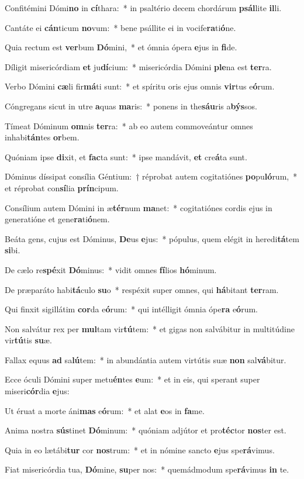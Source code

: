 \item Confitémini Dómi\textbf{no} in \textbf{cí}thara:~* in psaltério decem chordárum \textbf{psál}lite \textbf{il}li.
\item Cantáte ei \textbf{cán}ticum \textbf{no}vum:~* bene psállite ei in vocife\textbf{ra}ti\textbf{ó}ne.
\item Quia rectum est \textbf{ver}bum \textbf{Dó}mini,~* et ómnia ópera \textbf{e}jus in \textbf{fi}de.
\item Díligit misericórdiam \textbf{et} ju\textbf{dí}cium:~* misericórdia Dómini \textbf{ple}na est \textbf{ter}ra.
\item Verbo Dómini \textbf{cæ}li fir\textbf{má}ti sunt:~* et spíritu oris ejus omnis \textbf{vir}tus e\textbf{ó}rum.
\item Cóngregans sicut in utre \textbf{a}quas \textbf{ma}ris:~* ponens in the\textbf{sáu}ris a\textbf{býs}sos.
\item Tímeat Dóminum \textbf{om}nis \textbf{ter}ra:~* ab eo autem commoveántur omnes inhabi\textbf{tán}tes \textbf{or}bem.
\item Quóniam ipse \textbf{di}xit, et \textbf{fac}ta sunt:~* ipse mandávit, \textbf{et} cre\textbf{á}ta sunt.
\item Dóminus díssipat consília Géntium:~† réprobat autem cogitatiónes \textbf{po}pu\textbf{ló}rum,~* et réprobat con\textbf{sí}lia \textbf{prín}cipum.
\item Consílium autem Dómini in æ\textbf{tér}num \textbf{ma}net:~* cogitatiónes cordis ejus in generatióne et gene\textbf{ra}ti\textbf{ó}nem.
\item Beáta gens, cujus est Dóminus, \textbf{De}us \textbf{e}jus:~* pópulus, quem elégit in heredi\textbf{tá}tem \textbf{si}bi.
\item De cælo re\textbf{spé}xit \textbf{Dó}minus:~* vidit omnes \textbf{fí}lios \textbf{hó}minum.
\item De præparáto habi\textbf{tá}culo \textbf{su}o~* respéxit super omnes, qui \textbf{há}bitant \textbf{ter}ram.
\item Qui finxit sigillátim \textbf{cor}da e\textbf{ó}rum:~* qui intélligit ómnia ópe\textbf{ra} e\textbf{ó}rum.
\item Non salvátur rex per \textbf{mul}tam vir\textbf{tú}tem:~* et gigas non salvábitur in multitúdine vir\textbf{tú}tis \textbf{su}æ.
\item Fallax equus \textbf{ad} sa\textbf{lú}tem:~* in abundántia autem virtútis suæ \textbf{non} sal\textbf{vá}bitur.
\item Ecce óculi Dómini super metu\textbf{én}tes \textbf{e}um:~* et in eis, qui sperant super miseri\textbf{cór}dia \textbf{e}jus:
\item Ut éruat a morte áni\textbf{mas} e\textbf{ó}rum:~* et alat \textbf{e}os in \textbf{fa}me.
\item Anima nostra \textbf{sús}tinet \textbf{Dó}minum:~* quóniam adjútor et pro\textbf{téc}tor \textbf{nos}ter est.
\item Quia in eo lætábi\textbf{tur} cor \textbf{nos}trum:~* et in nómine sancto \textbf{e}jus spe\textbf{rá}vimus.
\item Fiat misericórdia tua, \textbf{Dó}mine, \textbf{su}per nos:~* quemádmodum spe\textbf{rá}vimus \textbf{in} te.
